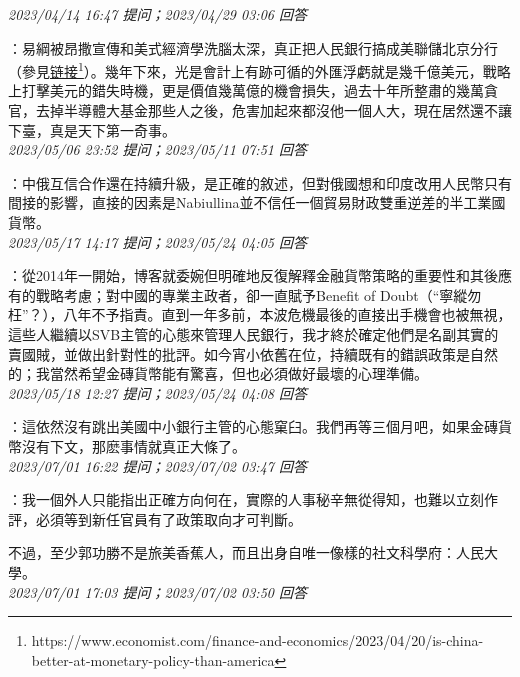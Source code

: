 \documentclass[twocolumn]{ctexart}
\begin{document}
\textit{\hfill\noindent\small 2023/04/14 16:47 提问；2023/04/29 03:06 回答}

：易綱被昂撒宣傳和美式經濟學洗腦太深，真正把人民銀行搞成美聯儲北京分行（參見\href{https://www.economist.com/finance-and-economics/2023/04/20/is-china-better-at-monetary-policy-than-america}{链接\footnote{\url{https://www.economist.com/finance-and-economics/2023/04/20/is-china-better-at-monetary-policy-than-america}}}）。幾年下來，光是會計上有跡可循的外匯浮虧就是幾千億美元，戰略上打擊美元的錯失時機，更是價值幾萬億的機會損失，過去十年所整肅的幾萬貪官，去掉半導體大基金那些人之後，危害加起來都沒他一個人大，現在居然還不讓下臺，真是天下第一奇事。
\\

\textit{\hfill\noindent\small 2023/05/06 23:52 提问；2023/05/11 07:51 回答}

：中俄互信合作還在持續升級，是正確的敘述，但對俄國想和印度改用人民幣只有間接的影響，直接的因素是Nabiullina並不信任一個貿易財政雙重逆差的半工業國貨幣。
\\

\textit{\hfill\noindent\small 2023/05/17 14:17 提问；2023/05/24 04:05 回答}

：從2014年一開始，博客就委婉但明確地反復解釋金融貨幣策略的重要性和其後應有的戰略考慮；對中國的專業主政者，卻一直賦予Benefit of Doubt（“寧縱勿枉”？），八年不予指責。直到一年多前，本波危機最後的直接出手機會也被無視，這些人繼續以SVB主管的心態來管理人民銀行，我才終於確定他們是名副其實的賣國賊，並做出針對性的批評。如今宵小依舊在位，持續既有的錯誤政策是自然的；我當然希望金磚貨幣能有驚喜，但也必須做好最壞的心理準備。
\\

\textit{\hfill\noindent\small 2023/05/18 12:27 提问；2023/05/24 04:08 回答}

：這依然沒有跳出美國中小銀行主管的心態窠臼。我們再等三個月吧，如果金磚貨幣沒有下文，那麽事情就真正大條了。
\\

\textit{\hfill\noindent\small 2023/07/01 16:22 提问；2023/07/02 03:47 回答}

：我一個外人只能指出正確方向何在，實際的人事秘辛無從得知，也難以立刻作評，必須等到新任官員有了政策取向才可判斷。

不過，至少郭功勝不是旅美香蕉人，而且出身自唯一像樣的社文科學府：人民大學。
\\

\textit{\hfill\noindent\small 2023/07/01 17:03 提问；2023/07/02 03:50 回答}
\end{document}
